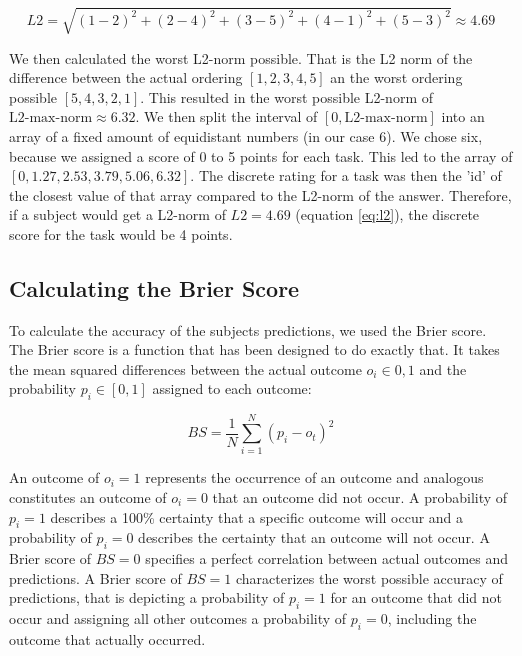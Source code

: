 \documentclass[../main/main.tex]{subfiles}
\begin{document}
	\begin{equation}
		\label{eq:l2}
		L2 = \sqrt{(1-2)^2 + (2-4)^2 + (3-5)^2 + (4-1)^2  + (5 - 3)^2} \approx 4.69
	\end{equation}
	
	We then calculated the worst L2-norm possible. That is the L2 norm of the difference between the actual ordering $[1, 2, 3, 4, 5]$ an the worst ordering possible $[5, 4, 3, 2, 1]$. This resulted in the worst possible L2-norm of $\text{L2-max-norm} \approx 6.32$. We then split the interval of $[0, \text{L2-max-norm}]$ into an array of a fixed amount of equidistant numbers (in our case 6). We chose six, because we assigned a score of 0 to 5 points for each task. This led to the array of $[0, 1.27, 2.53, 3.79, 5.06, 6.32]$. The discrete rating for a task was then the 'id' of the closest value of that array compared to the L2-norm of the answer. Therefore, if a subject would get a L2-norm of $L2 = 4.69$ (equation \ref{eq:l2}), the discrete score for the task would be 4 points.
	
	\subsection{Calculating the Brier Score}
	
	To calculate the accuracy of the subjects predictions, we used the Brier score. The Brier score is a function that has been designed to do exactly that. It takes the mean squared differences between the actual outcome $o_i \in {0, 1}$ and the probability $p_i \in [0, 1]$ assigned to each outcome:
	
	\begin{equation}
		BS = \frac{1}{N}\sum_{i=1}^{N} (p_i - o_t)^2
	\end{equation}
	
	\noindent An outcome of $o_i = 1$ represents the occurrence of an outcome and analogous constitutes an outcome of $o_i = 0$ that an outcome did not occur. A probability of $p_i = 1$ describes a 100\% certainty that a specific outcome will occur and a probability of $p_i = 0$ describes the certainty that an outcome will not occur. A Brier score of $BS = 0$ specifies a perfect correlation between actual outcomes and predictions. A Brier score of $BS = 1$ characterizes the worst possible accuracy of predictions, that is depicting a probability of $p_i = 1$ for an outcome that did not occur and assigning all other outcomes a probability of $p_i = 0$, including the outcome that actually occurred.
	
\end{document}
